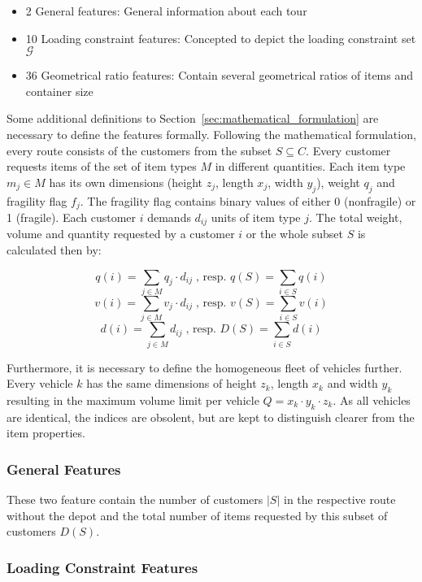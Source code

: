 \begin{itemize}
	\item 2 General features: General information about each tour
	\item 10 Loading constraint features: Concepted to depict the loading constraint set $\mathcal{G}$
	\item 36 Geometrical ratio features: Contain several geometrical ratios of items and container size
\end{itemize}

Some additional definitions to Section~\ref{sec:mathematical_formulation}
are necessary to define the features formally. Following the mathematical formulation, every route consists of the customers
from the subset $S \subseteq C$. Every customer requests items of the set of item types $M$ in different quantities.
Each item type $m_j\in M$ has its own dimensions (height $z_j$, length $x_j$, width $y_j$), weight $q_j$ and fragility flag $f_j$.
The fragility flag contains binary values of either 0 (nonfragile) or 1 (fragile).
Each customer $i$ demands $d_{ij}$ units of item type $j$.
The total weight, volume and quantity requested by a customer $i$ or the whole subset $S$ is calculated then by:

\[q(i) = \sum_{j \in M} q_j \cdot d_{ij}\;\text{, resp. } q(S) = \sum_{i\in S} q(i)\]
\[v(i) = \sum_{j \in M} v_j \cdot d_{ij}\;\text{, resp. } v(S) = \sum_{i\in S} v(i)\]
\[d(i) = \sum_{j \in M} d_{ij}\;\text{, resp. } D(S) = \sum_{i\in S} d(i)\]

Furthermore, it is necessary to define the homogeneous fleet of vehicles
further. Every vehicle $k$ has the same dimensions of height $z_k$, length $x_k$ and width $y_k$ resulting in the maximum volume limit per
vehicle $Q = x_k \cdot y_k\cdot z_k$. As all vehicles are identical, the indices are obsolent, but are kept to distinguish clearer
from the item properties.

\subsubsection{General Features}
These two feature contain the number of customers $|S|$ in the respective route without the depot and the total number of items requested by
this subset of customers $D(S)$.

\subsubsection{Loading Constraint Features}

